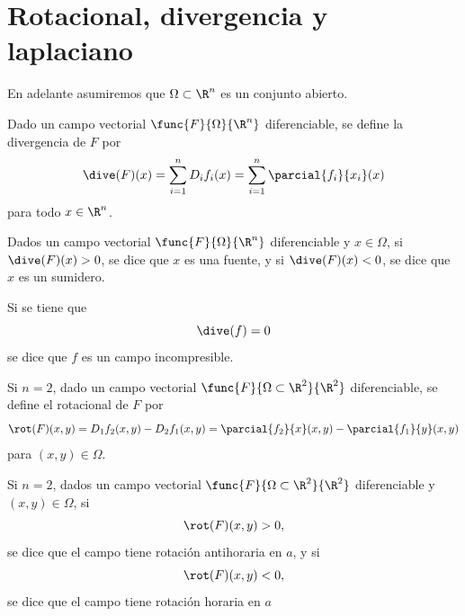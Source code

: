 \documentclass[a4,11pt]{aleph-notas}
\begin{document}

\section{Rotacional, divergencia y laplaciano}


En adelante asumiremos que $\Omega\subset \R^n$ es un conjunto abierto.

\begin{defi}[Divergencia]
    Dado un campo vectorial $\func{F}{\Omega}{\R^n}$ diferenciable, se define la divergencia de $F$ por
    \[
        \dive(F)(x) = \sum_{i=1}^n D_i f_i(x) = \sum_{i=1}^n \parcial{f_i}{x_i}(x)
    \]
    para todo $x\in\R^n$.
\end{defi}

\begin{defi}
    Dados un campo vectorial $\func{F}{\Omega}{\R^n}$ diferenciable y $x\in\Omega$, si $\dive(F)(x)>0$, se dice que $x$ es una fuente, y si $\dive(F)(x)<0$, se dice que $x$ es un sumidero.
\end{defi}

\begin{advertencia}
    Si se tiene que
    \[
        \dive(f) = 0
    \]
    se dice que $f$ es un campo incompresible.
\end{advertencia}

\begin{defi}[Rotacional en $\R^2$]
    Si $n=2$, dado un campo vectorial $\func{F}{\Omega\subset \R^2}{\R^2}$ diferenciable, se define el rotacional de $F$ por
    \[
        \rot(F)(x,y) = D_1 f_2(x,y) - D_2 f_1(x,y) = \parcial{f_2}{x}(x,y) - \parcial{f_1}{y}(x,y)
    \]
    para $(x,y)\in \Omega$.
\end{defi}

\begin{defi}
    Si $n=2$, dados un campo vectorial $\func{F}{\Omega\subset \R^2}{\R^2}$ diferenciable y $(x,y)\in\Omega$, si
    \[
        \rot(F)(x,y)>0,
    \]
    se dice que el campo tiene rotación antihoraria en $a$, y si
    \[
        \rot(F)(x,y)<0,
    \]
    se dice que el campo tiene rotación horaria en $a$
\end{defi}
\end{document}
